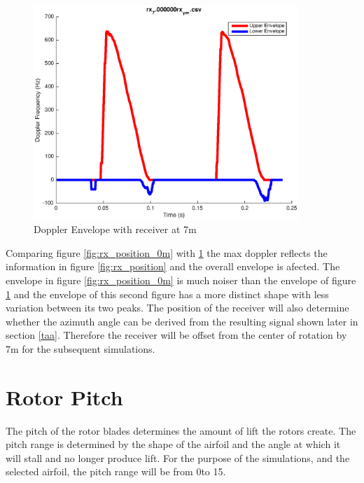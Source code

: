 \begin{figure}
	\begin{center}
		\includegraphics[width=10cm]{images/simulation/Doppler_Receiver_7m.eps}
		\caption{Doppler Envelope with receiver at 7m}
		\label{fig:rx_position_7m}
	\end{center}
\end{figure}

Comparing figure \ref{fig:rx_position_0m} with \ref{fig:rx_position_7m} the max doppler reflects the information in figure \ref{fig:rx_position} and the overall envelope is afected. The envelope in figure \ref{fig:rx_position_0m} is much noiser than the envelope of figure \ref{fig:rx_position_7m} and the envelope of this second figure has a more distinct shape with less variation between its two peaks. The position of the receiver will also determine whether the azimuth angle can be derived from the resulting signal shown later in section \ref{taa}. Therefore the receiver will be offset from the center of rotation by 7m for the subsequent simulations.


\section{Rotor Pitch}
The pitch of the rotor blades determines the amount of lift the rotors create. The pitch range is determined by the shape of the airfoil and the angle at which it will stall and no longer produce lift. For the purpose of the simulations, and the selected airfoil, the pitch range will be from 0\textdegree  \space to 15\textdegree.

